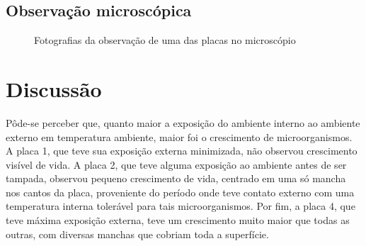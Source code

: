 \documentclass[12pt, titlepage]{article}
\begin{document}
\subsection{Observação microscópica}
\begin{figure}[H]
	\centering
	\captionsetup[subfigure]{justification=centering}
	\caption{Fotografias da observação de uma das placas no microscópio}
	\label{mic}
\end{figure}

\section{Discussão}
Pôde-se perceber que, quanto maior a exposição do ambiente interno ao ambiente externo em temperatura ambiente, maior foi o crescimento de microorganismos. A placa 1, que teve sua exposição externa minimizada, não observou crescimento visível de vida. A placa 2, que teve alguma exposição ao ambiente antes de ser tampada, observou pequeno crescimento de vida, centrado em uma só mancha nos cantos da placa, proveniente do período onde teve contato externo com uma temperatura interna tolerável para tais microorganismos. Por fim, a placa 4, que teve máxima exposição externa, teve um crescimento muito maior que todas as outras, com diversas manchas que cobriam toda a superfície.
\end{document}
